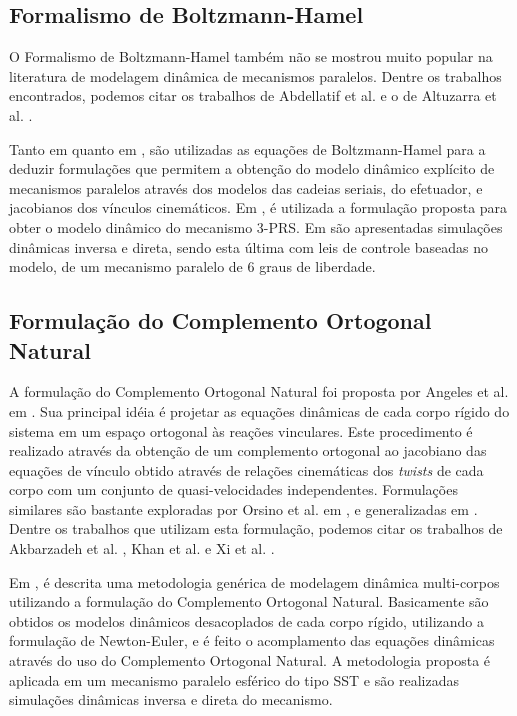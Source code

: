 \documentclass[]{politex}
\begin{document}
\subsection{Formalismo de Boltzmann-Hamel}

O Formalismo de Boltzmann-Hamel \cite{Jarzebowska} também não se mostrou muito popular na literatura de modelagem dinâmica de mecanismos paralelos. Dentre os trabalhos encontrados, podemos citar os trabalhos de Abdellatif et al. \cite{Abdellatif2} e o de Altuzarra et al. \cite{20altuzarra}.

Tanto em \cite{Abdellatif2} quanto em \cite{20altuzarra}, são utilizadas as equações de Boltzmann-Hamel para a deduzir formulações que permitem a obtenção do modelo dinâmico explícito de mecanismos paralelos através dos modelos das cadeias seriais, do efetuador, e jacobianos dos vínculos cinemáticos. Em \cite{20altuzarra}, é utilizada a formulação proposta para obter o modelo dinâmico do mecanismo 3-PRS. Em \cite{Abdellatif2} são apresentadas simulações dinâmicas inversa e direta, sendo esta última com leis de controle baseadas no modelo, de um mecanismo paralelo de 6 graus de liberdade.


\subsection{Formulação do Complemento Ortogonal Natural}

A formulação do Complemento Ortogonal Natural foi proposta por Angeles et al. em \cite{Angeles}. Sua principal idéia é projetar as equações dinâmicas de cada corpo rígido do sistema em um espaço ortogonal às reações vinculares. Este procedimento é realizado através da obtenção de um complemento ortogonal ao jacobiano das equações de vínculo obtido através de relações cinemáticas dos \emph{twists} de cada corpo com um conjunto de quasi-velocidades independentes. Formulações similares são bastante exploradas por Orsino et al. em \cite{22orsino}, e generalizadas em \cite{23orsino}. Dentre os trabalhos que utilizam esta formulação, podemos citar os trabalhos de Akbarzadeh et al. \cite{Akbarzadeh}, Khan et al. \cite{Khan} e Xi et al. \cite{Xi}.

Em \cite{Akbarzadeh}, é descrita uma metodologia genérica de modelagem dinâmica multi-corpos utilizando a formulação do Complemento Ortogonal Natural. Basicamente são obtidos os modelos dinâmicos desacoplados de cada corpo rígido, utilizando a formulação de Newton-Euler, e é feito o acomplamento das equações dinâmicas através do uso do Complemento Ortogonal Natural. A metodologia proposta é aplicada em um mecanismo paralelo esférico do tipo SST e são realizadas simulações dinâmicas inversa e direta do mecanismo.
\end{document}
